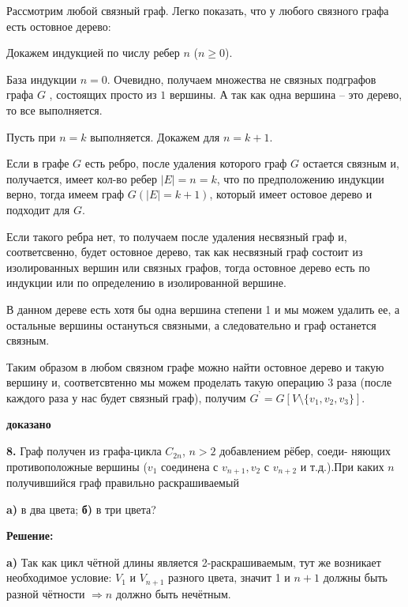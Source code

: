 \documentclass[a4paper,12pt]{article} %
\begin{document}
Рассмотрим любой связный граф. Легко показать, что у любого связного графа есть остовное дерево:


Докажем индукцией по числу ребер $n$ ($n \geqslant 0$).

База индукции $n = 0$. Очевидно, получаем множества не связных подграфов графа $G$ , состоящих просто из $1$ вершины. А так как одна вершина -- это дерево, то все выполняется.

Пусть при $n=k$ выполняется. Докажем для $n = k + 1$.

Если в графе $G$ есть ребро, после удаления которого граф $G$ остается связным и, получается, имеет кол-во ребер $|E| = n = k$,  что по предположению индукции верно, тогда имеем граф $G(|E| = k+1)$, который имеет остовое дерево и подходит для $G$.

Если такого ребра нет, то получаем после удаления несвязный граф и, соответсвенно, будет остовное дерево, так как несвязный граф состоит из изолированных вершин или связных графов, тогда остовное дерево есть по индукции или по определению в изолированной вершине.

В данном дереве есть хотя бы одна вершина степени 1 и мы можем удалить ее, а остальные вершины остануться связными, а следовательно и граф останется связным.

Таким образом в любом связном графе можно найти остовное дерево и такую вершину и, соответсвтенно мы можем проделать такую операцию $3$ раза (после каждого раза у нас будет связный граф), получим $G^{\textbf{'}} = G[V\setminus \{ v_1,v_2,v_3\} ]$.

\begin{flushright}
\begin{large}
\textbf {доказано }
\end{large}
\end{flushright}

{\bf 8.} Граф получен из графа-цикла $C_{2n}$, $n > 2$ добавлением рёбер, соеди-
няющих противоположные вершины ($v_1$ соединена с $v_{n+1}, v_2$ с $v_{n+2}$ и т.д.).При каких $n$ получившийся граф правильно раскрашиваемый

{\bf a)} в два цвета; {\bf б)} в три цвета?
\begin{center}
\bfseries
{\Large Решение: }
\end{center}

{\bf a)} Так как цикл чётной длины является 2-раскрашиваемым, тут же возникает необходимое условие: $V_1$ и $V_{n + 1}$ разного цвета, значит 1 и $n+1$ должны быть разной чётности $ \Rightarrow n$ должно быть нечётным.
\end{document}
